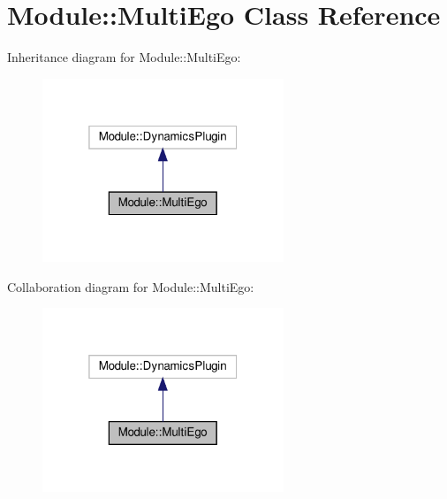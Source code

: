 \hypertarget{classModule_1_1MultiEgo}{}\section{Module\+:\+:Multi\+Ego Class Reference}
\label{classModule_1_1MultiEgo}


Inheritance diagram for Module\+:\+:Multi\+Ego\+:\nopagebreak
\begin{figure}[H]
\begin{center}
\leavevmode
\includegraphics[width=205pt]{classModule_1_1MultiEgo__inherit__graph}
\end{center}
\end{figure}


Collaboration diagram for Module\+:\+:Multi\+Ego\+:\nopagebreak
\begin{figure}[H]
\begin{center}
\leavevmode
\includegraphics[width=205pt]{classModule_1_1MultiEgo__coll__graph}
\end{center}
\end{figure}
